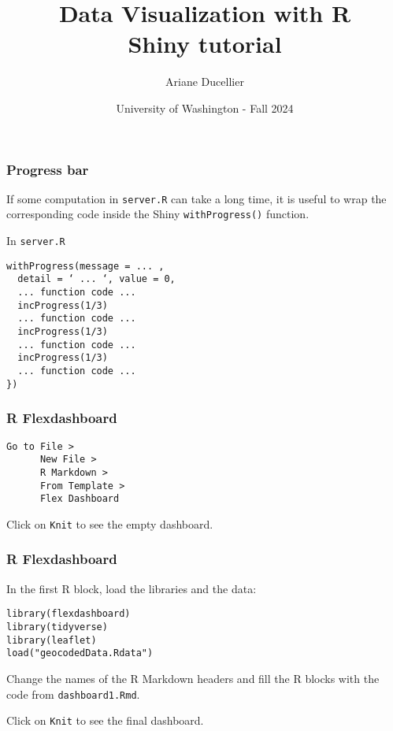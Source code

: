 \documentclass{beamer}
\title[Data Visualization with R - Shiny tutorial]{Data Visualization with R \\ Shiny tutorial}
\author{Ariane Ducellier}
\date{University of Washington - Fall 2024}
\begin{document}
	\begin{frame}
		\titlepage
	\end{frame}

	\begin{frame}[fragile]
		\frametitle{Progress bar}

		If some computation in \verb|server.R| can take a long time, it is useful to wrap the corresponding code inside the Shiny \verb|withProgress()| function.

		\vspace{1em}

		In \verb|server.R|
		\begin{exampleblock}{}
		\begin{BVerbatim}
withProgress(message = ... ,
  detail = ‘ ... ‘, value = 0,
  ... function code ...
  incProgress(1/3)
  ... function code ...
  incProgress(1/3)
  ... function code ...
  incProgress(1/3)
  ... function code ...
})
		\end{BVerbatim}
		\end{exampleblock}{}

	\end{frame}

	\begin{frame}[fragile]
		\frametitle{R Flexdashboard}

		\begin{exampleblock}{}
		\begin{BVerbatim}
Go to File >
      New File >
      R Markdown >
      From Template >
      Flex Dashboard
		\end{BVerbatim}
		\end{exampleblock}{}

		\vspace{2em}

		Click on \verb|Knit| to see the empty dashboard.
	
	\end{frame}

	\begin{frame}[fragile]
		\frametitle{R Flexdashboard}

		In the first R block, load the libraries and the data:
		
		\begin{exampleblock}{}
		\begin{BVerbatim}
library(flexdashboard)
library(tidyverse)
library(leaflet)
load("geocodedData.Rdata")
		\end{BVerbatim}
		\end{exampleblock}{}

		\vspace{2em}

		Change the names of the R Markdown headers and fill the R blocks with the code from \verb|dashboard1.Rmd|.

		\vspace{2em}

		Click on \verb|Knit| to see the final dashboard.
	
	\end{frame}
\end{document}
